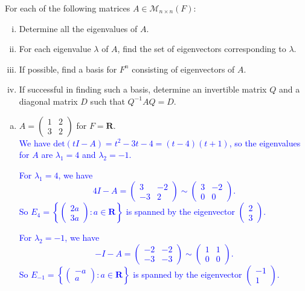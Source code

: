 \documentclass[a4paper,11pt]{article}
\newcommand{\R}{\mathbf{R}}
\newcommand{\M}{\mathcal{M}}
\newcommand{\ddet}{\text{det}}
\newcommand{\blue}[1]{\textcolor{blue}{#1}}
\begin{document}
 For each of the following matrices $A \in \M_{n
  \times n}(F)$:
\begin{enumerate}[(i)]
\item Determine all the eigenvalues of $A$.
\item For each eigenvalue $\lambda$ of $A$, find the set of eigenvectors
  corresponding to $\lambda$.
\item If possible, find a basis for $F^n$ consisting of eigenvectors of $A$.
\item If successful in finding such a basis, determine an invertible matrix $Q$
  and a diagonal matrix $D$ such that $Q^{-1}AQ=D$.
\end{enumerate}
\begin{enumerate}[(a)]
\item $A=\left( \begin{smallmatrix}1&2\\3&2\end{smallmatrix} \right)$ for
  $F=\R$. \\

  \blue{We have $\ddet(tI-A)=t^2-3t-4=(t-4)(t+1)$, so the eigenvalues for $A$
    are $\lambda_1=4$ and $\lambda_2=-1$.}

  \blue{For $\lambda_1=4$, we have
    \[
      4I-A =
      \left(
        \begin{array}{rr}
          3&-2\\-3&2
        \end{array}
      \right)
      \sim
      \left(
        \begin{array}{rr}
          3&-2\\0&0
        \end{array}
      \right).
    \]
    So $E_4=\left\{ \left( \begin{smallmatrix}2a\\3a\end{smallmatrix}
      \right) : a \in \R \right\}$ is spanned by the eigenvector
    $\left( \begin{smallmatrix}2\\3\end{smallmatrix} \right)$.}

  \blue{For $\lambda_2=-1$, we have
    \[
      -I-A =
      \left(
        \begin{array}{rr}
          -2&-2\\-3&-3
        \end{array}
      \right)
      \sim
      \left(
        \begin{array}{rr}
          1&1\\0&0
        \end{array}
      \right).
    \]
    So $E_{-1}=\left\{ \left( \begin{smallmatrix}-a\\a\end{smallmatrix} \right)
      : a \in \R \right\}$ is spanned by the eigenvector
    $\left( \begin{smallmatrix}-1\\1\end{smallmatrix} \right)$.}


\end{enumerate}
\end{document}
